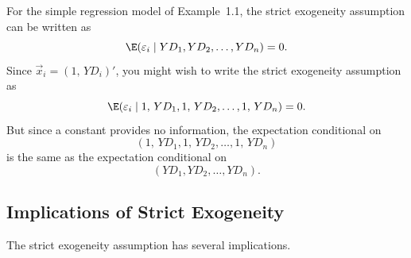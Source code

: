 
\begin{example}
\label{ex:1.3}
For the simple regression model of Example~1.1, the strict exogeneity
assumption can be written as
\[
  \E(\varepsilon_i \mid YD_1, YD_2, \ldots, YD_n) = 0.
\]
Since $\vec{x}_i = (1,\, YD_i)'$, you might wish to write the strict exogeneity
assumption as
\[
  \E(\varepsilon_i \mid 1,\, YD_1, 1,\, YD_2, \ldots, 1,\, YD_n) = 0.
\]
But since a constant provides no information, the expectation conditional on
\[
  (1,\, YD_1, 1,\, YD_2, \ldots, 1,\, YD_n)
\]
is the same as the expectation conditional on
\[
  (YD_1, YD_2, \ldots, YD_n).
\]
\end{example}

\subsection*{Implications of Strict Exogeneity}

The strict exogeneity assumption has several implications.

